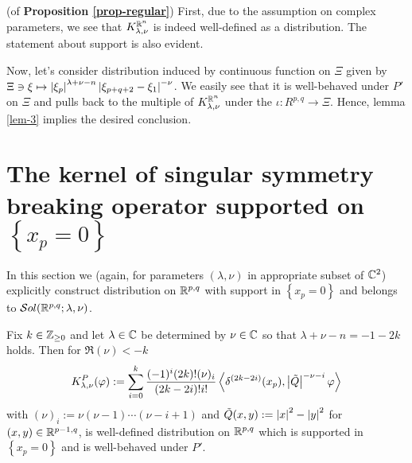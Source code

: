 \documentclass[10pt]{article} %
\theoremstyle{definition}
\theoremstyle{remark}
\begin{document}
\begin{myproof}(of {\bf Proposition \ref{prop-regular}})\newline
	First, due to the assumption on complex parameters, we see that $K_{ \lambda,\nu }^{ \mathbb{R}^n }$ is indeed well-defined as a
	distribution. The statement about support is also evident.\par
	Now, let's consider distribution induced by continuous function on $\Xi$ given by
	$\Xi\ni\xi\mapsto\left|\xi_p\right|^{\lambda+\nu-n}\left|\xi_{p+q+2}-\xi_1\right|^{-\nu}$. We easily see that 
	it is well-behaved under $P'$ on $\Xi$ and pulls back to the multiple of $K_{ \lambda,\nu }^{ \mathbb{R}^n }$
	under the $\iota:R^{p,q}\to\Xi$. Hence,
	lemma \ref{lem-3} implies the desired conclusion.
\end{myproof}
\section{The kernel of singular symmetry breaking operator supported on $\left\{ x_p=0 \right\}$}
In this section we (again, for parameters $(\lambda,\nu)$ in appropriate subset of $\mathbb{C}^2$)
explicitly construct distribution on $\mathbb{R}^{p,q}$ with support in $\left\{ x_p=0 \right\}$ and belongs to $\mathcal{S}ol(\mathbb{R}^{p,q};\lambda,\nu)$.
\begin{myprop}
	Fix $k\in\mathbb{Z}_{\ge0}$ and let $\lambda\in\mathbb{C}$ be determined by $\nu\in\mathbb{C}$ so that $\lambda+\nu-n=-1-2k$ holds.
	Then for $\Re(\nu)<-k$ 
	\[K_{\lambda,\nu}^P(\varphi):=\sum_{i=0}^k\frac{(-1)^i(2k)!(\nu)_i}{(2k-2i)!i!}
		\myabra{\delta^{(2k-2i)}(x_p),\myabs{\tilde{Q}}^{-\nu-i}\varphi}
	\] with $(\nu)_i:=\nu(\nu-1)\cdots(\nu-i+1)$ and $\tilde{Q}(x,y):=\left|x\right|^2-\left|y\right|^2$ for $(x,y)\in\mathbb{R}^{p-1,q}$,
	is well-defined distribution on $\mathbb{R}^{p,q}$ which is supported in $\left\{ x_p=0 \right\}$ and is well-behaved
	under $P'$.
\end{myprop}
\end{document}
